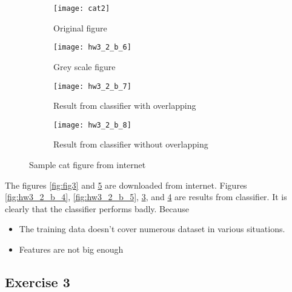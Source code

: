 \documentclass[11pt]{article}
\begin{document}
\begin{enumerate}[label=(\alph*)]
\begin{enumerate}[label=(\roman*)]
\begin{figure}[H]
\begin{subfigure}{.5\textwidth}
  \centering
  \texttt{[image: cat2]}
  \caption{Original figure}
  \label{}
\end{subfigure}
\begin{subfigure}{.5\textwidth}
  \centering
  \texttt{[image: hw3\_2\_b\_6]}
  \caption{Grey scale figure}
  \label{fig:hw3_2_b_6}
\end{subfigure}

\begin{subfigure}{.5\textwidth}
  \centering
  \texttt{[image: hw3\_2\_b\_7]}
  \caption{Result from classifier with overlapping}
  \label{fig:hw3_2_b_7}
\end{subfigure}
\begin{subfigure}{.5\textwidth}
  \centering
  \texttt{[image: hw3\_2\_b\_8]}
  \caption{Result from classifier without overlapping}
  \label{fig:hw3_2_b_8}
\end{subfigure}
\caption{Sample cat figure from internet}
\label{fig:fig4}
\end{figure}

The figures \ref{fig:fig3} and \ref{fig:fig4} are downloaded from internet. Figures \ref{fig:hw3_2_b_4}, \ref{fig:hw3_2_b_5}, \ref{fig:hw3_2_b_7}, and \ref{fig:hw3_2_b_8} are results from classifier. It is clearly that the classifier performs badly. Because

\begin{itemize}
\item The training data doesn't cover numerous dataset in various situations.
\item Features are not big enough
\end{itemize}

\end{enumerate}


\end{enumerate}

\newpage

\subsection*{Exercise 3}
\end{document}
